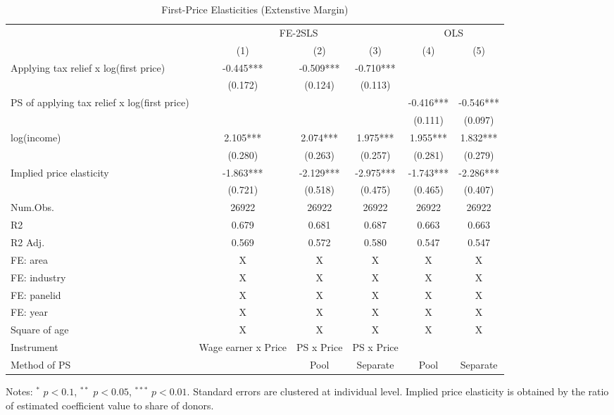 \documentclass[
  11pt,
  a4paper,
]{article}
\begin{document}
\begin{table}

\caption{\label{tab:extensive}First-Price Elasticities (Extenstive Margin)}
\centering
\fontsize{9}{11}\selectfont
\begin{threeparttable}
\begin{tabular}[t]{lccccc}
\toprule
\multicolumn{1}{c}{ } & \multicolumn{3}{c}{FE-2SLS} & \multicolumn{2}{c}{OLS} \\
\cmidrule(l{3pt}r{3pt}){2-4} \cmidrule(l{3pt}r{3pt}){5-6}
  & (1) & (2) & (3) & (4) & (5)\\
\midrule
Applying tax relief x log(first price) & -0.445*** & -0.509*** & -0.710*** &  & \\
 & (0.172) & (0.124) & (0.113) &  & \\
PS of applying tax relief x log(first price) &  &  &  & -0.416*** & -0.546***\\
 &  &  &  & (0.111) & (0.097)\\
log(income) & 2.105*** & 2.074*** & 1.975*** & 1.955*** & 1.832***\\
 & (0.280) & (0.263) & (0.257) & (0.281) & (0.279)\\
\midrule
Implied price elasticity & -1.863*** & -2.129*** & -2.975*** & -1.743*** & -2.286***\\
 & (0.721) & (0.518) & (0.475) & (0.465) & (0.407)\\
Num.Obs. & 26922 & 26922 & 26922 & 26922 & 26922\\
R2 & 0.679 & 0.681 & 0.687 & 0.663 & 0.663\\
R2 Adj. & 0.569 & 0.572 & 0.580 & 0.547 & 0.547\\
FE: area & X & X & X & X & X\\
FE: industry & X & X & X & X & X\\
FE: panelid & X & X & X & X & X\\
FE: year & X & X & X & X & X\\
Square of age & X & X & X & X & X\\
Instrument & Wage earner x Price & PS x Price & PS x Price &  & \\
Method of PS &  & Pool & Separate & Pool & Separate\\
\bottomrule
\end{tabular}
\begin{tablenotes}
\item Notes: $^{*}$ $p < 0.1$, $^{**}$ $p < 0.05$, $^{***}$ $p < 0.01$. Standard errors are clustered at individual level. Implied price elasticity is obtained by the ratio of estimated coefficient value to share of donors.
\end{tablenotes}
\end{threeparttable}
\end{table}
\end{document}
